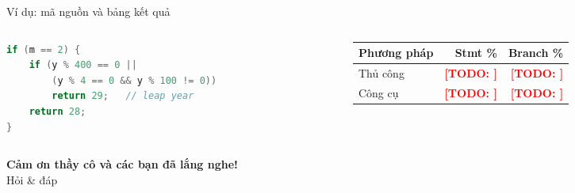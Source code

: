 \documentclass[aspectratio=169,11pt]{beamer}
\newcommand{\todo}[1]{\textcolor{red}{\textbf{[TODO: #1]}}}
\begin{document}
\begin{frame}[fragile]{Ví dụ: mã nguồn và bảng kết quả}
  \begin{columns}[T]
    \begin{column}{0.5\textwidth}
\begin{lstlisting}[language=Java]
if (m == 2) {
    if (y % 400 == 0 ||
        (y % 4 == 0 && y % 100 != 0))
        return 29;   // leap year
    return 28;
}
\end{lstlisting}
    \end{column}
    \begin{column}{0.46\textwidth}
      \scriptsize
      \begin{tabularx}{\linewidth}{@{}l R R@{}}
        \toprule
        \textbf{\color{hustred}Phương pháp} & \textbf{\color{hustred}Stmt \%} & \textbf{\color{hustred}Branch \%} \\
        \midrule
        Thủ công & \todo{} & \todo{} \\
        Công cụ  & \todo{} & \todo{} \\
        \bottomrule
      \end{tabularx}
    \end{column}
  \end{columns}
\end{frame}

\begin{frame}[plain]
  \centering\vfill
  {\Large\bfseries\color{hustred} Cảm ơn thầy cô và các bạn đã lắng nghe!}\\[1ex]
  {\small Hỏi \& đáp}
  \vfill
\end{frame}
\end{document}

